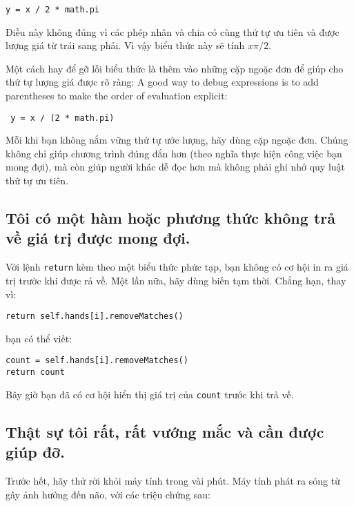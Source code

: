 \documentclass[11pt]{book}
\begin{document}
\beforeverb
\begin{verbatim}
y = x / 2 * math.pi
\end{verbatim}
\afterverb
%
Điều này không đúng vì các phép nhân và chia có cùng thứ tự
ưu tiên và được lượng giá từ trái sang phải. Vì vậy biểu thức
này sẽ tính $x \pi / 2$.

Một cách hay để gỡ lỗi biểu thức là thêm vào những cặp ngoặc đơn
để giúp cho thứ tự lượng giá được rõ ràng: 
A good way to debug expressions is to add parentheses to make
the order of evaluation explicit:

\beforeverb
\begin{verbatim}
 y = x / (2 * math.pi)
\end{verbatim}
\afterverb
%
Mỗi khi bạn không nắm vững thứ tự ước lượng, hãy dùng 
cặp ngoặc đơn. Chúng không chỉ giúp chương trình đúng đắn hơn
(theo nghĩa thực hiện công việc bạn mong đợi), mà còn giúp
người khác dễ đọc hơn mà không phải ghi nhớ quy luật 
thứ tự ưu tiên.


\subsection{Tôi có một hàm hoặc phương thức không trả về giá trị
được mong đợi.} 

Với lệnh {\tt return} kèm theo một biểu thức phức tạp,
bạn không có cơ hội in ra giá trị trước khi được rả về.
Một lần nữa, hãy dùng biến tạm thời. Chẳng hạn, thay vì:

\beforeverb
\begin{verbatim}
return self.hands[i].removeMatches()
\end{verbatim}
\afterverb
%
bạn có thể viết:

\beforeverb
\begin{verbatim}
count = self.hands[i].removeMatches()
return count
\end{verbatim}
\afterverb
%
Bây giờ bạn đã có cơ hội hiển thị giá trị của 
{\tt count} trước khi trả về.


\subsection{Thật sự tôi rất, rất vướng mắc và cần được giúp đỡ.}

Trước hết, hãy thử rời khỏi máy tính trong vài phút. 
Máy tính phát ra sóng từ gây ảnh hưởng đến não, với các triệu chứng sau:
\end{document}
